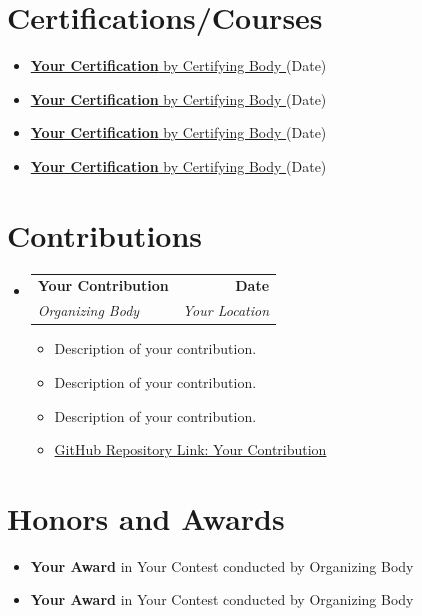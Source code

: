 \documentclass[a4paper,11pt]{article}
\makeatletter
\newcommand{\resumeItem}[1]{\item\small{{#1 \vspace{-2pt}}}}
\newcommand{\resumeSubheading}[4]{
  \vspace{-2pt}\item
    \begin{tabular*}{0.97\textwidth}[t]{l@{\extracolsep{\fill}}r}
      \textbf{#1} & \textbf{\small #2} \\
      \textit{\small#3} & \textit{\small #4} \\
    \end{tabular*}\vspace{-7pt}
}
\newcommand{\resumeSubHeadingListStart}{\begin{itemize}[leftmargin=0.15in, label={}]}
\newcommand{\resumeSubHeadingListEnd}{\end{itemize}}
\newcommand{\resumeItemListStart}{\begin{itemize}}
\newcommand{\resumeItemListEnd}{\end{itemize}\vspace{-5pt}}
\makeatother
\begin{document}
\vspace{-3pt}
\section{Certifications/Courses}
  \resumeItemListStart[parsep = 0pt]
    \resumeItem{\href{https://yourcertification.com}{\textbf{Your Certification} by Certifying Body \faExternalLink*} (Date)}
    \resumeItem{\href{https://yourcertification.com}{\textbf{Your Certification} by Certifying Body \faExternalLink*} (Date)}
    \resumeItem{\href{https://yourcertification.com}{\textbf{Your Certification} by Certifying Body \faExternalLink*} (Date)}
    \resumeItem{\href{https://yourcertification.com}{\textbf{Your Certification} by Certifying Body \faExternalLink*} (Date)}
  \resumeItemListEnd

\section{Contributions}
  \resumeSubHeadingListStart
    \resumeSubheading
      {Your Contribution}{Date}
      {Organizing Body}{Your Location}
      \resumeItemListStart
        \resumeItem{Description of your contribution.}
        \resumeItem{Description of your contribution.}
        \resumeItem{Description of your contribution.}
        \resumeItem{\href{https://github.com/yourprofile/yourcontribution}{GitHub Repository Link: Your Contribution}}
      \resumeItemListEnd
  \resumeSubHeadingListEnd

\vspace{-11pt}
\section{Honors and Awards}
  \resumeItemListStart[parsep = -2pt]
    \resumeItem{\textbf{Your Award} in Your Contest conducted by Organizing Body}
    \resumeItem{\textbf{Your Award} in Your Contest conducted by Organizing Body}
  \resumeItemListEnd

\end{document}
